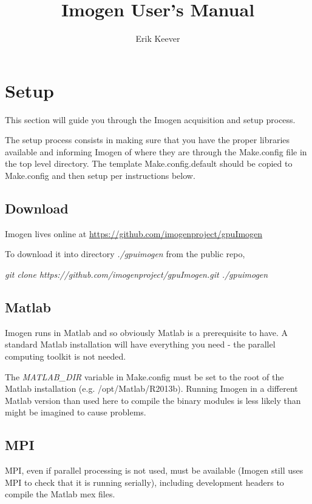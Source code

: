 \documentclass[letterpaper,12pt,twocolumn]{article}
\author{Erik Keever}
\title{Imogen User's Manual}
\begin{document}
 

\maketitle

\section{Setup}

This section will guide you through the Imogen acquisition and setup process.

The setup process consists in making sure that you have the proper libraries
available and informing Imogen of where they are through the Make.config file
in the top level directory. The template Make.config.default should be copied
to Make.config and then setup per instructions below.

\subsection{Download}

Imogen lives online at \url{https://github.com/imogenproject/gpuImogen}

To download it into directory \textit{./gpuimogen} from the public repo,

\textit{ git clone https://github.com/imogenproject/gpuImogen.git ./gpuimogen }

\subsection{Matlab}

Imogen runs in Matlab and so obviously Matlab is a prerequisite to have. A standard
Matlab installation will have everything you need - the parallel computing toolkit
is not needed.

The \textit{MATLAB\_DIR} variable in Make.config must be set to the root of
the Matlab installation (e.g. /opt/Matlab/R2013b). Running Imogen in a different
Matlab version than used here to compile the binary modules is less likely than
might be imagined to cause problems.

\subsection{MPI}

MPI, even if parallel processing is not used, must be available (Imogen still
uses MPI to check that it is running serially), including development headers
to compile the Matlab mex files.
\end{document}
